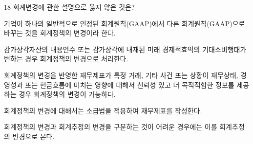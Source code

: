 \begin{question}{18}
회계변경에 관한 설명으로 옳지 않은 것은?
\begin{choices}
  \item 기업이 하나의 일반적으로 인정된 회계원칙(GAAP)에서 다른 회계원칙(GAAP)으로 바꾸는 것을 회계정책의 변경이라 한다.
  \item 감가상각자산의 내용연수 또는 감가상각에 내재된 미래 경제적효익의 기대소비행태가 변하는 경우 회계정책의 변경으로 처리한다.
  \item 회계정책의 변경을 반영한 재무제표가 특정 거래, 기타 사건 또는 상황이 재무상태, 경영성과 또는 현금흐름에 미치는 영향에 대해서 신뢰성 있고 더 목적적합한 정보를 제공하는 경우 회계정책의 변경이 가능하다.
  \item 회계정책의 변경에 대해서는 소급법을 적용하여 재무제표를 작성한다.
  \item 회계정책의 변경과 회계추정의 변경을 구분하는 것이 어려운 경우에는 이를 회계추정의 변경으로 본다.
\end{choices}
\end{question}
